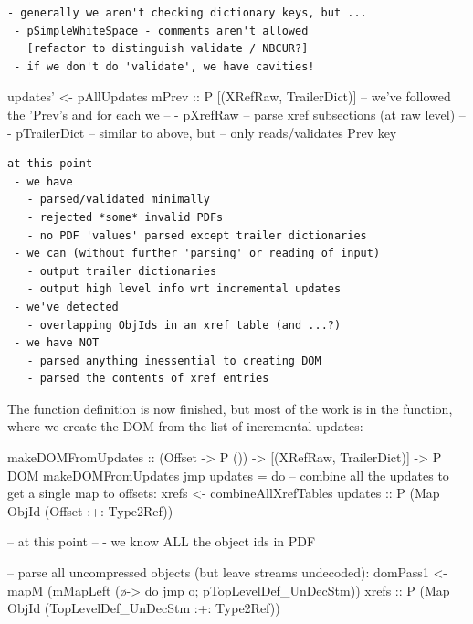 \begin{lstlisting}[style=meta]
 - generally we aren't checking dictionary keys, but ...
 - pSimpleWhiteSpace - comments aren't allowed
   [refactor to distinguish validate / NBCUR?]
 - if we don't do 'validate', we have cavities!
\end{lstlisting}
\begin{code}
    updates' <- pAllUpdates mPrev :: P [(XRefRaw, TrailerDict)]
       -- we've followed the 'Prev's and for each we
       --   - pXrefRaw     -- parse xref subsections (at raw level)
       --   - pTrailerDict -- similar to above, but
       --                     only reads/validates Prev key
\end{code}

\begin{lstlisting}[style=meta]
at this point
 - we have
   - parsed/validated minimally
   - rejected *some* invalid PDFs
   - no PDF 'values' parsed except trailer dictionaries
 - we can (without further 'parsing' or reading of input)
   - output trailer dictionaries
   - output high level info wrt incremental updates
 - we've detected
   - overlapping ObjIds in an xref table (and ...?)
 - we have NOT
   - parsed anything inessential to creating DOM
   - parsed the contents of xref entries
\end{lstlisting}


The  function definition is now finished, but most of
the work is in the  function,
where we create the DOM from the list of incremental updates:

\begin{code}
makeDOMFromUpdates :: (Offset -> P ()) -> [(XRefRaw, TrailerDict)] -> P DOM
makeDOMFromUpdates jmp updates =
    do
    -- combine all the updates to get a single map to offsets:
    xrefs <- combineAllXrefTables updates
             :: P (Map ObjId (Offset :+: Type2Ref))

    -- at this point
    --  - we know ALL the object ids in PDF

    -- parse all uncompressed objects (but leave streams undecoded):
    domPass1 <- mapM
                  (mMapLeft (\o-> do {jmp o; pTopLevelDef_UnDecStm}))
                  xrefs
                :: P (Map ObjId (TopLevelDef_UnDecStm :+: Type2Ref))
\end{code}

